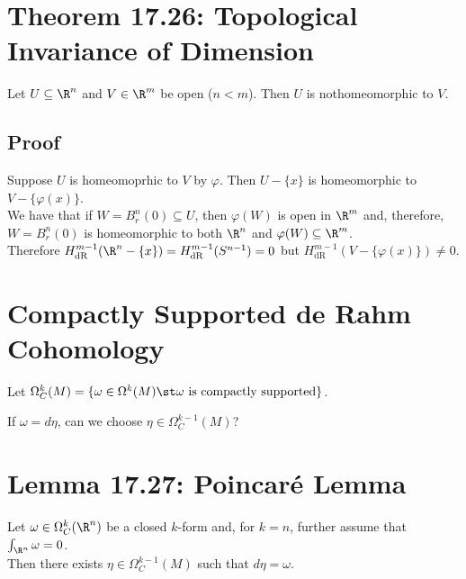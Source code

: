 \documentclass[11pt]{article}
\begin{document}
\section*{Theorem 17.26: Topological Invariance of Dimension}
\label{sec:orgd578e91}
Let \(U\subseteq\R^{n}\) and \(V\in\R^{m}\) be open (\(n<m\)). Then \(U\) is nothomeomorphic to \(V\).\\
\subsection*{Proof}
\label{sec:orgd8b4de3}
Suppose \(U\) is homeomoprhic to \(V\) by \(\varphi\). Then \(U-\{x\}\) is homeomorphic to \(V-\{\varphi(x)\}\).\\
We have that if \(W=B_{r}^{n}(0)\subseteq U\), then \(\varphi(W)\) is open in \(\R^{m}\) and, therefore, \(W=B_{r}^{n}(0)\) is homeomorphic to both \(\R^{n}\) and \(\varphi(W)\subseteq\R^{m}\).\\
Therefore \(H^{m-1}_{\text{dR}}(\R^{n}-\{x\})=H^{m-1}_{\text{dR}}(S^{n-1})=0\) but \(H^{m-1}_{\text{dR}}(V-\{\varphi(x)\})\neq0\).\\
\section*{Compactly Supported de Rahm Cohomology}
\label{sec:org13574bf}
Let \(\Omega^{k}_{C}(M)=\{\omega\in\Omega^{k}(M)\st\omega\text{ is compactly supported}\}\).\\
If \(\omega=d\eta\), can we choose \(\eta\in\Omega^{k-1}_{C}(M)\)?\\
\section*{Lemma 17.27: Poincaré Lemma}
\label{sec:org592b231}
Let \(\omega\in\Omega^{k}_{C}(\R^{n})\) be a closed \(k\)-form and, for \(k=n\), further assume that \(\int_{\R^{n}}\omega=0\).\\
Then there exists \(\eta\in\Omega^{k-1}_{C}(M)\) such that \(d\eta=\omega\).\\
\end{document}
